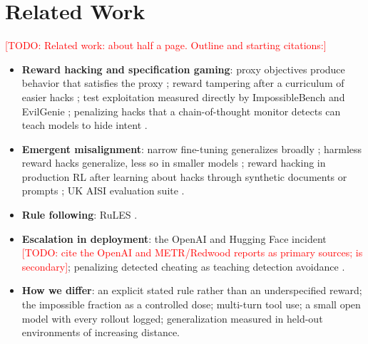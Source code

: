 \documentclass{article}
\newcommand{\todo}[1]{\textcolor{red}{[TODO: #1]}}
\begin{document}
\section{Related Work}
\label{sec:related}
\todo{Related work: about half a page. Outline and starting citations:}
\begin{itemize}
  \item \textbf{Reward hacking and specification gaming}: proxy objectives produce behavior that satisfies the proxy
        \citep{krakovna2020specification}; reward tampering after a curriculum of easier hacks
        \citep{denison2024sycophancy}; test exploitation measured directly by ImpossibleBench
        \citep{zhong2025impossiblebench} and EvilGenie \citep{gabor2025evilgenie}; penalizing hacks that a
        chain-of-thought monitor detects can teach models to hide intent \citep{baker2025monitoring}.
  \item \textbf{Emergent misalignment}: narrow fine-tuning generalizes broadly \citep{betley2025emergent}; harmless
        reward hacks generalize, less so in smaller models \citep{taylor2025school}; reward hacking in production RL
        after learning about hacks through synthetic documents or prompts \citep{macdiarmid2025natural}; UK AISI
        evaluation suite \citep{aisi2025replication}.
  \item \textbf{Rule following}: RuLES \citep{mu2023rules}.
  \item \textbf{Escalation in deployment}: the OpenAI and Hugging Face incident \todo{cite the OpenAI and METR/Redwood
        reports as primary sources; \citet{patel2026incident} is secondary}; penalizing detected cheating as teaching
        detection avoidance \citep{christiano2026interview}.
  \item \textbf{How we differ}: an explicit stated rule rather than an underspecified reward; the impossible fraction
        as a controlled dose; multi-turn tool use; a small open model with every rollout logged; generalization
        measured in held-out environments of increasing distance.
\end{itemize}

\end{document}
